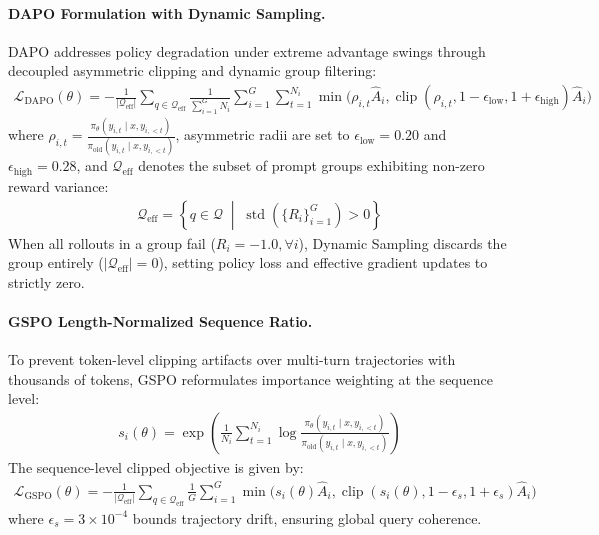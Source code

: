 \documentclass{article}
\theoremstyle{plain}
\theoremstyle{definition}
\theoremstyle{remark}
\begin{document}
\paragraph{DAPO Formulation with Dynamic Sampling.}
DAPO addresses policy degradation under extreme advantage swings through decoupled asymmetric clipping and dynamic group filtering:
\begin{align}
\mathcal{L}_{\text{DAPO}}(\theta) = -\frac{1}{|\mathcal{Q}_{\text{eff}}|} \sum_{q \in \mathcal{Q}_{\text{eff}}} \frac{1}{\sum_{i=1}^G N_i} \sum_{i=1}^G \sum_{t=1}^{N_i} \min \Big( \rho_{i,t} \hat{A}_i, \operatorname{clip}(\rho_{i,t}, 1 - \epsilon_{\text{low}}, 1 + \epsilon_{\text{high}}) \hat{A}_i \Big)
\end{align}
where $\rho_{i,t} = \frac{\pi_\theta(y_{i,t} \mid x, y_{i,<t})}{\pi_{\text{old}}(y_{i,t} \mid x, y_{i,<t})}$, asymmetric radii are set to $\epsilon_{\text{low}} = 0.20$ and $\epsilon_{\text{high}} = 0.28$, and $\mathcal{Q}_{\text{eff}}$ denotes the subset of prompt groups exhibiting non-zero reward variance:
\begin{align}
\mathcal{Q}_{\text{eff}} = \left\{ q \in \mathcal{Q} \;\middle|\; \operatorname{std}\left(\{R_i\}_{i=1}^G\right) > 0 \right\}
\end{align}
When all rollouts in a group fail ($R_i = -1.0, \forall i$), Dynamic Sampling discards the group entirely ($|\mathcal{Q}_{\text{eff}}| = 0$), setting policy loss and effective gradient updates to strictly zero.

\paragraph{GSPO Length-Normalized Sequence Ratio.}
To prevent token-level clipping artifacts over multi-turn trajectories with thousands of tokens, GSPO reformulates importance weighting at the sequence level:
\begin{align}
s_i(\theta) = \exp \left( \frac{1}{N_i} \sum_{t=1}^{N_i} \log \frac{\pi_\theta(y_{i,t} \mid x, y_{i,<t})}{\pi_{\text{old}}(y_{i,t} \mid x, y_{i,<t})} \right)
\end{align}
The sequence-level clipped objective is given by:
\begin{align}
\mathcal{L}_{\text{GSPO}}(\theta) = -\frac{1}{|\mathcal{Q}_{\text{eff}}|} \sum_{q \in \mathcal{Q}_{\text{eff}}} \frac{1}{G} \sum_{i=1}^G \min \Big( s_i(\theta) \hat{A}_i, \operatorname{clip}(s_i(\theta), 1 - \epsilon_s, 1 + \epsilon_s) \hat{A}_i \Big)
\end{align}
where $\epsilon_s = 3 \times 10^{-4}$ bounds trajectory drift, ensuring global query coherence.
\end{document}
